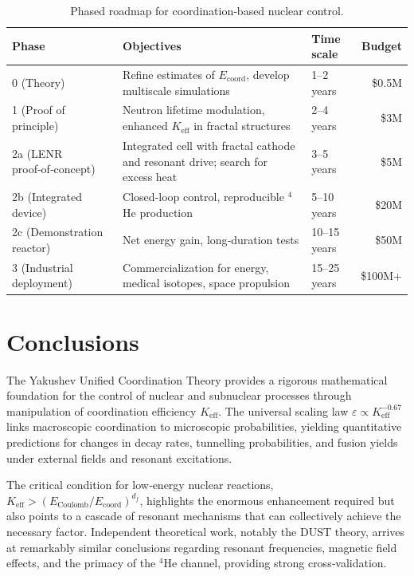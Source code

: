 \documentclass[12pt]{article}
\theoremstyle{remark}
\newcommand{\Keff}{K_{\mathrm{eff}}}
\newcommand{\df}{d_{\!f}}
\begin{document}
	\begin{table}[htbp]
		\centering
		\caption{Phased roadmap for coordination‑based nuclear control.}
		\label{tab:roadmap}
		\small
		\begin{tabular}{l p{5cm} l r}
			\toprule
			\textbf{Phase} & \textbf{Objectives} & \textbf{Time scale} & \textbf{Budget} \\
			\midrule
			0 (Theory) & Refine estimates of \(E_{\mathrm{coord}}\), develop multiscale simulations & 1–2 years & \$0.5M \\
			1 (Proof of principle) & Neutron lifetime modulation, enhanced \(\Keff\) in fractal structures & 2–4 years & \$3M \\
			2a (LENR proof‑of‑concept) & Integrated cell with fractal cathode and resonant drive; search for excess heat & 3–5 years & \$5M \\
			2b (Integrated device) & Closed‑loop control, reproducible \(^4\)He production & 5–10 years & \$20M \\
			2c (Demonstration reactor) & Net energy gain, long‑duration tests & 10–15 years & \$50M \\
			3 (Industrial deployment) & Commercialization for energy, medical isotopes, space propulsion & 15–25 years & \$100M+ \\
			\bottomrule
		\end{tabular}
	\end{table}
	
	\section{Conclusions}
	\label{sec:conclusion}
	
	The Yakushev Unified Coordination Theory provides a rigorous mathematical foundation for the control of nuclear and subnuclear processes through manipulation of coordination efficiency \(\Keff\). The universal scaling law \(\varepsilon \propto \Keff^{-0.67}\) links macroscopic coordination to microscopic probabilities, yielding quantitative predictions for changes in decay rates, tunnelling probabilities, and fusion yields under external fields and resonant excitations.
	
	The critical condition for low‑energy nuclear reactions, \(\Keff > (E_{\text{Coulomb}}/E_{\text{coord}})^{\df}\), highlights the enormous enhancement required but also points to a cascade of resonant mechanisms that can collectively achieve the necessary factor. Independent theoretical work, notably the DUST theory, arrives at remarkably similar conclusions regarding resonant frequencies, magnetic field effects, and the primacy of the \(^4\)He channel, providing strong cross‑validation.
	
\end{document}
